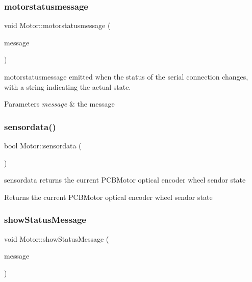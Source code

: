 \subsubsection{\texorpdfstring{motorstatusmessage}{motorstatusmessage}}
{\footnotesize\ttfamily void Motor\+::motorstatusmessage (\begin{DoxyParamCaption}\item[{const Q\+String \&}]{message }\end{DoxyParamCaption})\hspace{0.3cm}{\ttfamily [signal]}}



motorstatusmessage emitted when the status of the serial connection changes, with a string indicating the actual state. 


\begin{DoxyParams}{Parameters}
{\em message} & the message \\
\hline
\end{DoxyParams}
\mbox{\label{classMotor_a3e5e0ed8b8095588a09283200aaeb142}} 
\subsubsection{\texorpdfstring{sensordata()}{sensordata()}}
{\footnotesize\ttfamily bool Motor\+::sensordata (\begin{DoxyParamCaption}{ }\end{DoxyParamCaption})}



sensordata returns the current P\+C\+B\+Motor optical encoder wheel sendor state 

\begin{DoxyReturn}{Returns}
the current P\+C\+B\+Motor optical encoder wheel sendor state 
\end{DoxyReturn}
\mbox{\label{classMotor_a3d9df9be923b64306fa28dff13ceaa2e}} 
\subsubsection{\texorpdfstring{show\+Status\+Message}{showStatusMessage}}
{\footnotesize\ttfamily void Motor\+::show\+Status\+Message (\begin{DoxyParamCaption}\item[{const Q\+String \&}]{message }\end{DoxyParamCaption})\hspace{0.3cm}{\ttfamily [slot]}}



